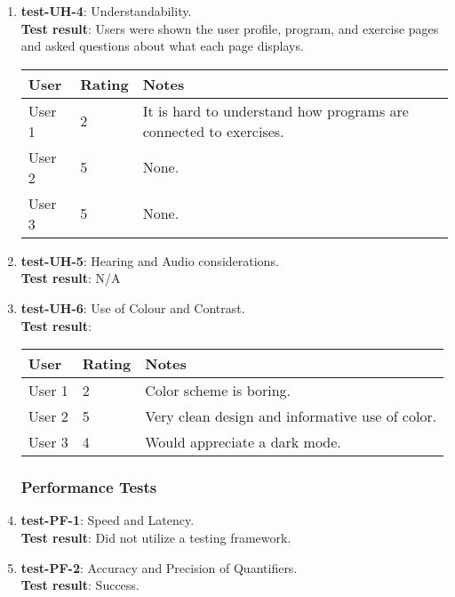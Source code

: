 \documentclass[12pt, titlepage]{article}
\begin{document}
\begin{enumerate}
	\item{\textbf{test-UH-4}}: Understandability.\\
	\textbf{Test result}:
	Users were shown the user profile, program, and exercise pages and asked questions about what each page displays.
	\begin{center}
		\begin{tabular}{ | m{3cm} | m{3cm}| m{6cm} | } 
		  \hline
		  User & Rating & Notes \\ 
		  \hline
		  User 1 & 2 & It is hard to understand how programs are connected to exercises. \\ 
		  \hline
		  User 2 & 5 & None. \\ 
		  \hline
		  User 3 & 5 & None. \\ 
		  \hline
		\end{tabular}
	\end{center}
	
	\item{\textbf{test-UH-5}}: Hearing and Audio considerations.\\
	\textbf{Test result}:
	N/A
	
	\item{\textbf{test-UH-6}}: Use of Colour and Contrast.\\
	\textbf{Test result}:
	\begin{center}
		\begin{tabular}{ | m{3cm} | m{3cm}| m{6cm} | } 
		  \hline
		  User & Rating & Notes \\ 
		  \hline
		  User 1 & 2 & Color scheme is boring. \\ 
		  \hline
		  User 2 & 5 & Very clean design and informative use of color. \\ 
		  \hline
		  User 3 & 4 & Would appreciate a dark mode.\\ 
		  \hline
		\end{tabular}
	\end{center}
	
\subsubsection{Performance Tests}
	\item{\textbf{test-PF-1}}: Speed and Latency.\\
	\textbf{Test result}: Did not utilize a testing framework.
	
	\item{\textbf{test-PF-2}}: Accuracy and Precision of Quantifiers.\\
	\textbf{Test result}: Success.
	

\end{enumerate}
\end{document}
